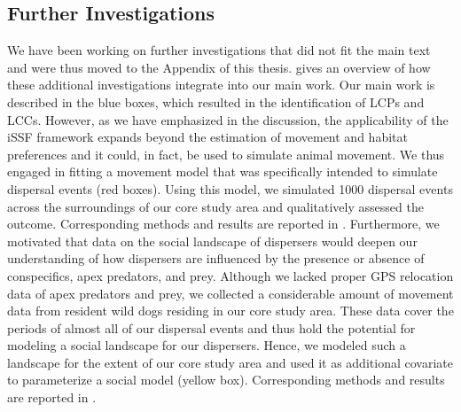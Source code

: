 \documentclass[abstract=on,10pt,a4paper,bibliography=totocnumbered]{scrartcl}
\begin{document}
\subsection{Further Investigations}
We have been working on further investigations that did not fit the main text
and were thus moved to the Appendix of this thesis. 
gives an overview of how these additional investigations integrate into our main
work. Our main work is described in the blue boxes, which resulted in the
identification of LCPs and LCCs. However, as we have emphasized in the
discussion, the applicability of the iSSF framework expands beyond the
estimation of movement and habitat preferences and it could, in fact, be used to
simulate animal movement. We thus engaged in fitting a movement model that was
specifically intended to simulate dispersal events (red boxes). Using this
model, we simulated 1000 dispersal events across the surroundings of our core
study area and qualitatively assessed the outcome. Corresponding methods and
results are reported in . Furthermore, we
motivated that data on the social landscape of dispersers would deepen our
understanding of how dispersers are influenced by the presence or absence of
conspecifics, apex predators, and prey. Although we lacked proper GPS relocation
data of apex predators and prey, we collected a considerable amount of movement
data from resident wild dogs residing in our core study area. These data cover
the periods of almost all of our dispersal events and thus hold the potential
for modeling a social landscape for our dispersers. Hence, we modeled such a
landscape for the extent of our core study area and used it as additional
covariate to parameterize a social model (yellow box). Corresponding methods and
results are reported in .
\end{document}
